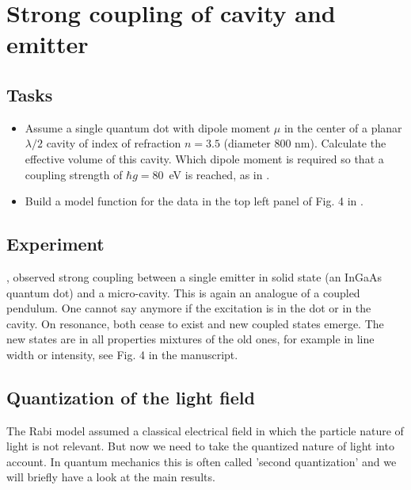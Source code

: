 

\chapter{Strong coupling of cavity and emitter}




\section{Tasks}

\begin{itemize}
\item Assume a single quantum dot with dipole moment $\mu$  in the center of a planar $\lambda/2$ cavity of index of refraction $n=3.5$  (diameter 800 nm). Calculate the effective volume of this cavity.
Which dipole moment is required so that a coupling strength of $\hbar g = 80$~\textmu eV is reached, as in \cite{Reithmaier04}. 

\item Build a model function for the data in the top left panel of Fig. 4 in \cite{Reithmaier04}. 

\end{itemize}



\section{Experiment}

\cite{Reithmaier04}, observed strong coupling between a single emitter in solid state (an InGaAs quantum dot) and a micro-cavity. This is again an analogue of a coupled pendulum. One cannot say anymore if the excitation is in the dot or in the cavity. On resonance, both cease to exist and new coupled states emerge. The new states are in all properties mixtures of the old ones, for example in line width or intensity, see Fig. 4 in the manuscript.

\section{Quantization of the light field}
The Rabi model assumed a classical electrical field in which the particle nature of light is not relevant. But now we need to take the quantized nature of light into account. In quantum mechanics this is often called 'second quantization' and we will briefly have a look at the main results.

